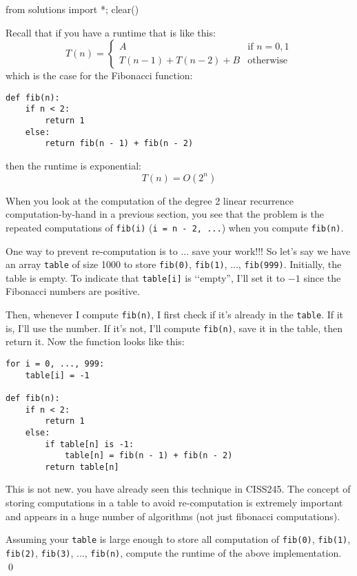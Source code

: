 \begin{python0}
from solutions import *; clear()
\end{python0}

Recall that if you have a runtime that is like this:
\[
T(n) 
= 
\begin{cases}
A                   & \text{if $n = 0, 1$} \\
T(n-1) + T(n-2) + B & \text{otherwise}
\end{cases}
\]
which is the case for the Fibonacci function:
\begin{Verbatim}[frame=single,fontsize=\footnotesize]
def fib(n):
    if n < 2:
        return 1
    else:
        return fib(n - 1) + fib(n - 2)
\end{Verbatim}
then the runtime is exponential:
\[
T(n) = O(2^n)
\]

When you look at the computation of the degree 2 linear recurrence
computation-by-hand in a previous section, 
you see that the problem is the repeated computations of 
\verb!fib(i)!
(\verb!i = n - 2, ...!) when you compute \verb!fib(n)!.

One way to prevent re-computation is to ... save your work!!!
So let's say we have an array \verb!table! of size 1000
to store \verb!fib(0)!, \verb!fib(1)!, ..., \verb!fib(999)!.
Initially, the table is empty.
To indicate that \verb!table[i]! is \lq\lq empty'',
I'll set it to $-1$ since the Fibonacci numbers are positive.

Then, whenever I compute \verb!fib(n)!, I first check if it's already in the 
\verb!table!.
If it is, I'll use the number.
If it's not, I'll compute \verb!fib(n)!, save it in the table,
then return it.
Now the function looks like this:
 
\begin{Verbatim}[frame=single,fontsize=\footnotesize]
for i = 0, ..., 999:
    table[i] = -1

def fib(n):
    if n < 2:
        return 1
    else:
        if table[n] is -1:
            table[n] = fib(n - 1) + fib(n - 2)
        return table[n]
\end{Verbatim}

This is not new.
you have already seen this technique in CISS245.
The concept of storing computations in a table to avoid
re-computation is extremely important and appears
in a huge number of algorithms (not just fibonacci computations).

\newpage
\begin{ex}
  Assuming your \verb!table! is large enough to store
  all computation of
  \verb!fib(0)!,
  \verb!fib(1)!,
  \verb!fib(2)!,
  \verb!fib(3)!,
  ...,
  \verb!fib(n)!,
  compute the runtime 
  of the above implementation.
\qed
\end{ex}

